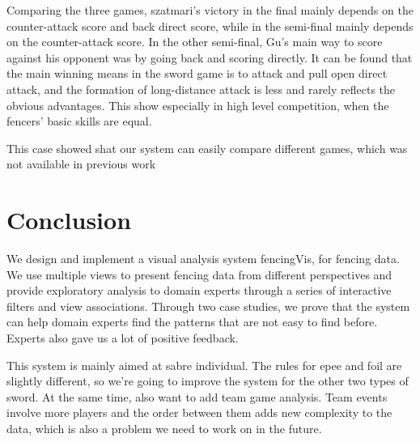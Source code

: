 \documentclass[journal]{vgtc}                %
\begin{document}
Comparing the three games, szatmari's victory in the final mainly depends on the counter-attack score and back direct score, while in the semi-final mainly depends on the counter-attack score.
In the other semi-final, Gu's main way to score against his opponent was by going back and scoring directly.
It can be found that the main winning means in the sword game is to attack and pull open direct attack, and the formation of long-distance attack is less and rarely reflects the obvious advantages.
This show especially in high level competition, when the fencers' basic skills are equal.

This case showed shat our system can easily compare different games, which was not available in previous work\cite{Wu2018iTTVis,polk2014tennivis}





\section{Conclusion}
We design and implement a visual analysis system fencingVis, for fencing data.
We use multiple views to present fencing data from different perspectives and provide exploratory analysis to domain experts through a series of interactive filters and view associations.
Through two case studies, we prove that the system can help domain experts find the patterns that are not easy to find before.
Experts also gave us a lot of positive feedback.

This system is mainly aimed at sabre individual.
The rules for epee and foil are slightly different, so we're going to improve the system for the other two types of sword.
At the same time, also want to add team game analysis.
Team events involve more players and the order between them adds new complexity to the data, which is also a problem we need to work on in the future.





%

%
%
%


\end{document}
